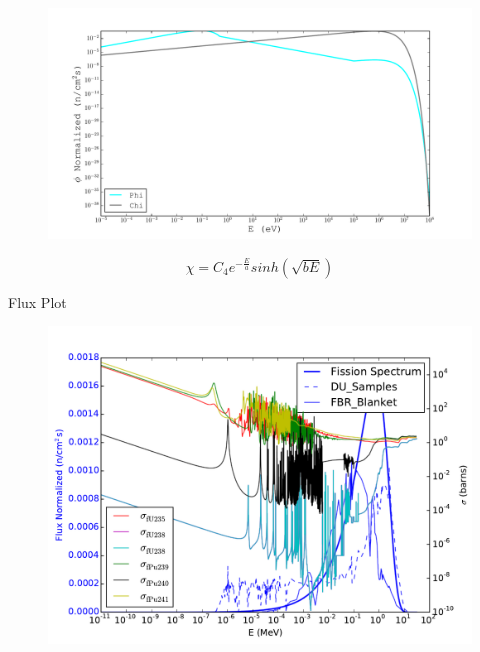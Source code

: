 \documentclass{beamer}
\begin{document}
\begin{frame}
      \begin{figure}[H]
        \vspace*{-1cm}
        \begin{center}
          \includegraphics[scale = 0.4]{../../Calculations/Project/Weighting/Figures/Phi_N_Chi.pdf}
          \vspace{-0.5cm}
        \end{center}
      \end{figure}
      \vspace{2cm}
      \begin{equation*}
        \chi=C_4e^{-\frac{E}{a}}sinh\left(\sqrt{bE}\right)
      \end{equation*}
\end{frame}


\begin{frame}{Flux Plot}
      \begin{figure}[H]
        \vspace*{-1cm}
        \begin{center}
          \includegraphics[scale = 0.55]{Cross_Section_Over_Spectrum.pdf}
          \vspace{-0.5cm}
        \end{center}
      \end{figure}
\end{frame}
\end{document}
